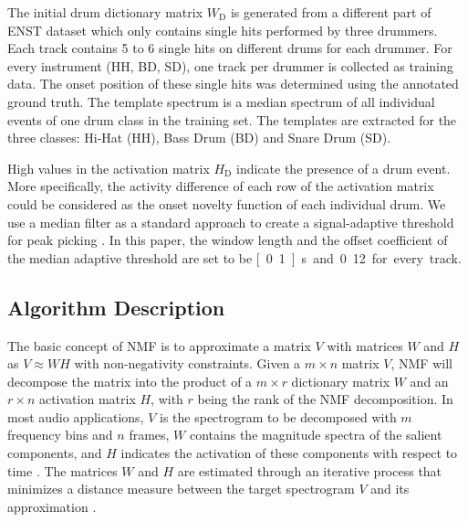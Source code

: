 \documentclass{article}
\begin{document}
The initial drum dictionary matrix $W_\mathrm{D}$ is generated from a different part of ENST dataset which only contains single hits performed by three drummers. Each track contains 5 to 6 single hits on different drums for each drummer. For every instrument (HH, BD, SD), one track per drummer is collected as training data. The onset position of these single hits was determined using the annotated ground truth. The template spectrum is a median spectrum of all individual events of one drum class in the training set. The templates are extracted for the three classes: Hi-Hat (HH), Bass Drum (BD) and Snare Drum (SD).   

High values in the activation matrix $H_\mathrm{D}$ indicate the presence of a drum event. More specifically, the activity difference of each row of the activation matrix could be considered as the onset novelty function of each individual drum. We use a median filter as a standard approach to create a signal-adaptive threshold for peak picking \cite{Lerch2012}. In this paper, the window length and the offset coefficient of the median adaptive threshold are set to be \unit[0.1]{s} and 0.12 for every track.

\subsection{Algorithm Description}\label{subsec:algorithm}
The basic concept of NMF is to approximate a matrix $V$ with matrices $W$ and $H$ as $V \approx WH$ with non-negativity constraints. Given a $m \times n$ matrix $V$, NMF will decompose the matrix into the product of a $m \times r$ dictionary matrix $W$ and an $r \times n$ activation matrix $H$, with $r$ being the rank of the NMF decomposition. In most audio applications, $V$ is the spectrogram to be decomposed with $m$ frequency bins and $n$ frames, $W$ contains the magnitude spectra of the salient components, and $H$ indicates the activation of these components with respect to time \cite{smaragdis_non-negative_2003}. The matrices $W$ and $H$ are estimated through an iterative process that minimizes a distance measure between the target spectrogram $V$ and its approximation \cite{lee_algorithms_2000}. 
\end{document}
